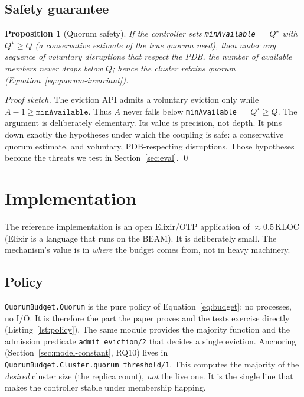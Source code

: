 \documentclass[AMA,Times1COL]{WileyNJDv5}
\newtheorem{qprop}{Proposition}
\begin{document}
\subsection{Safety guarantee}\label{sec:design-safety}
\begin{qprop}[Quorum safety]\label{prop:quorum}
If the controller sets \texttt{minAvailable} $=Q^\star$ with $Q^\star\ge Q$ (a conservative estimate of
the true quorum need), then under any sequence of voluntary disruptions that respect the PDB, the number
of available members never drops below $Q$; hence the cluster retains quorum
(Equation~\eqref{eq:quorum-invariant}).
\end{qprop}
\noindent\emph{Proof sketch.} The eviction API admits a voluntary eviction only while $A-1\ge
\texttt{minAvailable}$. Thus $A$ never falls below \texttt{minAvailable} $=Q^\star\ge Q$. The argument is
deliberately elementary. Its value is precision, not depth. It pins down exactly the hypotheses under
which the coupling is safe: a conservative quorum estimate, and voluntary, PDB-respecting disruptions.
Those hypotheses become the threats we test in Section~\ref{sec:eval}. \qed

\section{Implementation}\label{sec:impl}
The reference implementation is an open Elixir/OTP application of $\approx$$0.5$\,KLOC (Elixir is a
language that runs on the BEAM). It is deliberately small. The mechanism's value is in \emph{where} the
budget comes from, not in heavy machinery.

\subsection{Policy}\label{sec:impl-policy}
\texttt{QuorumBudget.Quorum} is the pure policy of Equation~\eqref{eq:budget}: no processes, no I/O. It is
therefore the part the paper proves and the tests exercise directly (Listing~\ref{lst:policy}). The same
module provides the majority function and the admission predicate \texttt{admit\_eviction/2} that decides
a single eviction. Anchoring (Section~\ref{sec:model-constant}, RQ10) lives in
\texttt{QuorumBudget.Cluster.quorum\_threshold/1}. This computes the majority of the \emph{desired}
cluster size (the replica count), \emph{not} the live one. It is the single line that makes the
controller stable under membership flapping.
\end{document}

